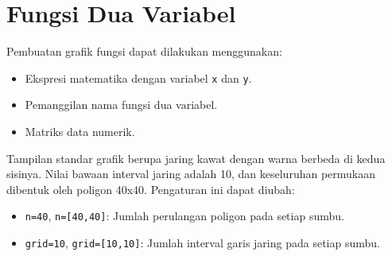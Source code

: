 \documentclass[a4paper,11pt,oneside,enabledeprecatedfontcommands]{scrbook}
\newenvironment{eulernotebook}{}{}
\newcommand{\eulerheading}[1]{\chapter{#1}}
\newenvironment{eulercomment}{\par\medskip\noindent}{\par\medskip}
\begin{document}
\begin{eulernotebook}
\eulerheading{Fungsi Dua Variabel}
\begin{eulercomment}
Pembuatan grafik fungsi dapat dilakukan menggunakan:
\begin{itemize}
    \item Ekspresi matematika dengan variabel \texttt{x} dan \texttt{y}.
    \item Pemanggilan nama fungsi dua variabel.
    \item Matriks data numerik.
\end{itemize}

Tampilan standar grafik berupa jaring kawat dengan warna berbeda di kedua sisinya. Nilai bawaan
interval jaring adalah 10, dan keseluruhan permukaan dibentuk oleh poligon 40x40. Pengaturan ini
dapat diubah:
\begin{itemize}
    \item \texttt{n=40}, \texttt{n=[40,40]}: Jumlah perulangan poligon pada setiap sumbu.
    \item \texttt{grid=10}, \texttt{grid=[10,10]}: Jumlah interval garis jaring pada setiap sumbu.
\end{itemize}


\end{eulercomment}
\end{eulernotebook}
\end{document}
